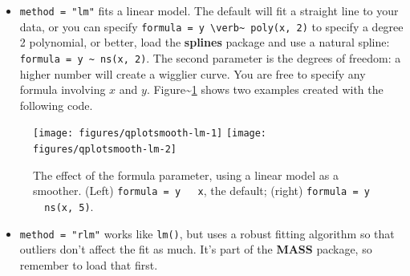 \begin{itemize}
\itemsep1pt\parskip0pt
\item
  \texttt{method = "lm"} fits a linear model. The default will fit a
  straight line to your data, or you can specify
  \texttt{formula = y \textbackslash{}verb\textbar{}\textasciitilde{}\textbar{} poly(x, 2)}
  to specify a degree 2 polynomial, or better, load the \textbf{splines}
  package and use a natural spline:
  \texttt{formula = y \textasciitilde{} ns(x, 2)}. The second parameter
  is the degrees of freedom: a higher number will create a wigglier
  curve. You are free to specify any formula involving \(x\) and \(y\).
  Figure\textasciitilde{}\ref{fig:smooth-lm} shows two examples created
  with the following code. 
\end{itemize}

\begin{Shaded}
\begin{Highlighting}[]
  \NormalTok{(}\NormalTok{, }\NormalTok{), }
   \NormalTok{)}
  \NormalTok{(}\NormalTok{, }\NormalTok{), }
   \NormalTok{, } \StringTok{ }\NormalTok{))}
\end{Highlighting}
\end{Shaded}

\begin{figure}
\texttt{[image: figures/qplotsmooth-lm-1]} \texttt{[image: figures/qplotsmooth-lm-2]} \caption{The effect of the formula parameter, using a linear model as a smoother.  (Left) \texttt{formula = y ~ x}, the default; (right) \texttt{formula = y ~ ns(x, 5)}.\label{fig:smooth-lm}}
\end{figure}

\begin{itemize}
\itemsep1pt\parskip0pt
\item
  \texttt{method = "rlm"} works like \texttt{lm()}, but uses a robust
  fitting algorithm so that outliers don't affect the fit as much. It's
  part of the \textbf{MASS} package, so remember to load that first.
   
\end{itemize}

